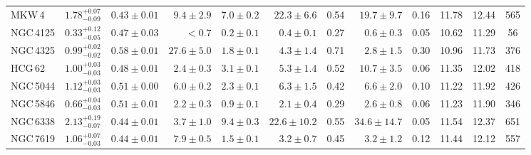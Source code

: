 \documentclass[useAMS,usenatbib]{mn2e}
\begin{document}
\begin{table}
\begin{tabular}{@{}lccrcrcrcccc@{}}
MKW\,4    & $1.78^{+0.07}_{-0.09}$ & $0.43\pm 0.01$ & $9.4\pm 2.9$ & 
    $7.0 \pm 0.2$ & $22.3\pm 6.6$ & 0.54 & $19.7\pm 9.7$ & 0.16 & 11.78 & 
    12.44 & 565 \\ 
NGC\,4125 & $0.33^{+0.12}_{-0.05}$ & $0.47\pm 0.03$ & $<0.7$ & 
    $0.2 \pm 0.1$ & $0.4\pm 0.1$ & 0.27 & $0.6\pm 0.3$   & 0.05 & 10.62 & 
    11.29 &   56 \\ 
NGC\,4325 & $0.99^{+0.02}_{-0.02}$ & $0.58\pm 0.01$ & $27.6\pm 5.0$ & 
    $1.8 \pm 0.1$ & $4.3\pm 1.4$ & 0.71 & $2.8\pm 1.5$   & 0.30 & 10.96 & 
    11.73 &   376 \\ 
HCG\,62   & $1.00^{+0.03}_{-0.03}$ & $0.48\pm 0.01$ & $2.4\pm 0.3$ & 
    $3.1 \pm 0.1$ & $5.3\pm 1.4$ & 0.52 &  $10.7\pm 3.5$ & 0.06 & 11.35 & 
    12.02 & 418 \\ 
NGC\,5044 & $1.12^{+0.03}_{-0.03}$ & $0.51\pm 0.00$ & $6.0\pm 0.2$ & 
    $2.3 \pm 0.1$ & $6.3\pm 1.5$ & 0.42 & $6.6\pm 2.0$   & 0.10 & 11.22 & 
    11.92 &   426 \\ 
NGC\,5846 & $0.66^{+0.04}_{-0.03}$ & $0.51\pm 0.01$ & $2.2\pm 0.3$ & 
    $0.9 \pm 0.1$ & $2.1\pm 0.4$ & 0.29 & $2.6\pm 0.8$   & 0.06 & 11.23 & 
    11.90 &   346 \\ 
NGC\,6338 & $2.13^{+0.19}_{-0.07}$ & $0.44\pm 0.01$ & $3.7\pm 1.0$ & 
    $9.4 \pm 0.3$ & $22.6\pm 10.2$ & 0.55 & $34.6\pm 14.7$ & 0.05 & 11.54 & 
    12.37 & 651 \\ 
NGC\,7619 & $1.06^{+0.07}_{-0.03}$ & $0.44\pm 0.01$ & $7.9\pm 0.5$ & 
    $1.5 \pm 0.1$ & $3.2\pm 0.7$ & 0.45 & $3.2\pm 1.2$ & 0.12 & 11.44 & 
    12.12 &  557 \\ 
\hline 
\end{tabular} 
\end{table} 
\end{document}
